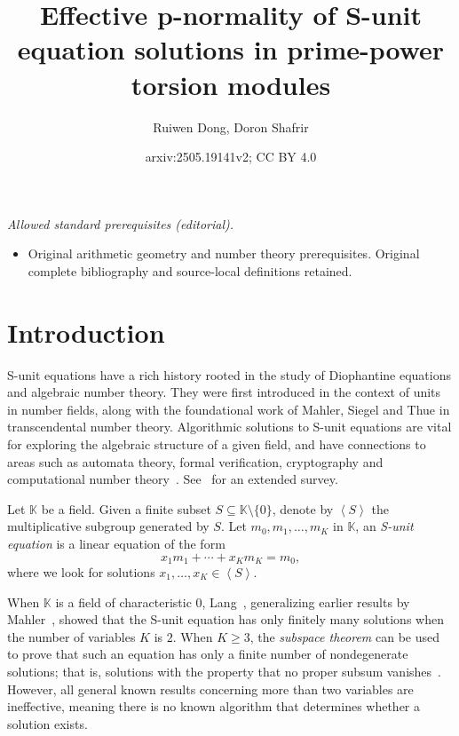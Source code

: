 \documentclass[letterpaper, 11pt, thm-restate]{article}
\title{Effective p-normality of S-unit equation solutions in prime-power torsion modules}
\author{Ruiwen Dong, Doron Shafrir}
\date{arxiv:2505.19141v2; CC BY 4.0}
\numberwithin{equation}{section}
\newcommand{\K}{\mathbb{K}}
\newcommand{\gen}[1]{\left\langle {#1} \right\rangle}
\theoremstyle{definition}
\theoremstyle{definition}
\theoremstyle{definition}
\begin{document}
\maketitle
\noindent\textit{Allowed standard prerequisites (editorial).}\begin{itemize}
\item Original arithmetic geometry and number theory prerequisites. Original complete bibliography and source-local definitions retained.
\end{itemize}\medskip
\section{Introduction}
S-unit equations have a rich history rooted in the study of Diophantine equations and algebraic number theory. They were first introduced in the context of units in number fields, along with the foundational work of Mahler, Siegel and Thue in transcendental number theory. 
Algorithmic solutions to S-unit equations are vital for exploring the algebraic structure of a given field, and have connections to areas such as automata theory, formal verification, cryptography and computational number theory~\cite{10.5555/1481045, adamczewski2012vanishing, 10.1007/978-3-030-80914-0_1, lipton2022skolem, benedikt2023complexity}.
See~\cite{Evertse1988} for an extended survey.

Let $\K$ be a field.
Given a finite subset $S \subseteq \K \setminus \{0\}$, denote by $\gen{S}$ the multiplicative subgroup generated by $S$.
Let $m_0, m_1, \ldots, m_K$ in $\K$, an \emph{S-unit equation} is a linear equation of the form
\begin{equation}\label{eq:Sunitintrofield}
    x_1 m_1 + \cdots + x_K m_K = m_0,
\end{equation}
where we look for solutions $x_1, \ldots, x_K \in \gen{S}$.

When $\K$ is a field of characteristic $0$, Lang~\cite{Lang1960}, generalizing earlier results by Mahler~\cite{Mahler1932}, showed that the S-unit equation has only finitely many solutions when the number of variables $K$ is $2$.
When $K \geq 3$, the \emph{subspace
theorem} can be used to prove that such an equation has only a finite number of nondegenerate solutions; that is, solutions with the property that no proper subsum vanishes~\cite{Evertse1984,PoortenSchlickewei1991}.
However, all general known results concerning more than two variables are ineffective, meaning there is no known algorithm that determines whether a solution exists.
\end{document}
